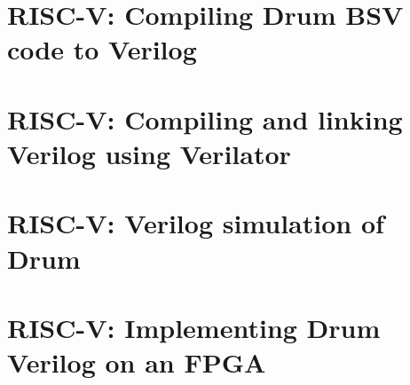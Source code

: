 
\section{RISC-V: Compiling Drum BSV code to Verilog}

\label{Sec_FSMs_Drum_compile_to_verilog}


\section{RISC-V: Compiling and linking Verilog using Verilator}

\label{Sec_FSMs_Drum_verilator}


\section{RISC-V: Verilog simulation of Drum}

\label{Sec_FSMs_Drum_simulation}


\section{RISC-V: Implementing Drum Verilog on an FPGA}

\label{Sec_FSMs_Drum_FPGA}

